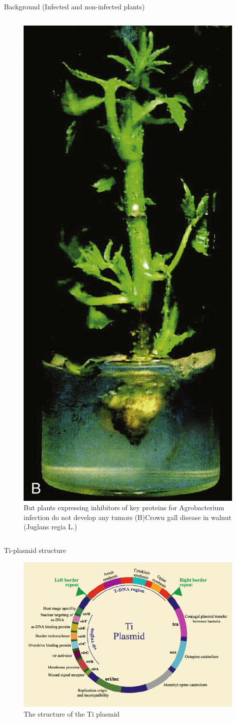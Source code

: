 \documentclass[ignorenonframetext,aspectratio=169]{beamer}
\begin{document}
\begin{frame}{Background (Infected and non-infected plants)}
\begin{columns}[T,onlytextwidth]
\begin{figure}
\includegraphics[width=0.4\linewidth]{../images/agrobacterium_gall_b} \caption{But plants expressing inhibitors of key proteins for Agrobacterium infection do not develop any tumors (B)\newline Crown gall disease in walnut (Juglans regia L.)}\label{fig:agrobacterium-gall2}
\end{figure}
    
\end{columns}

\end{frame}

\begin{frame}{Ti-plasmid structure}
\protect\hypertarget{ti-plasmid-structure}{}

\begin{figure}
\includegraphics[width=0.5\linewidth]{../images/Ti_plasmid} \caption{The structure of the Ti plasmid}\label{fig:ti-plasmid}
\end{figure}

\end{frame}
\end{document}
